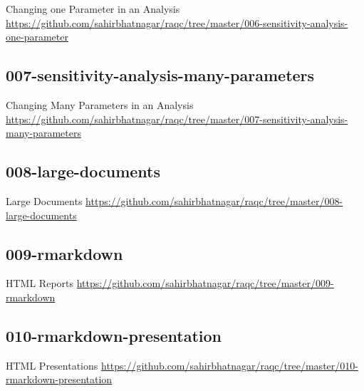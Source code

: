 \documentclass[10pt]{beamer}\usepackage[]{graphicx}\usepackage[]{color}
\begin{document}
\begin{frame}{Changing one Parameter in an Analysis}
\href{https://github.com/sahirbhatnagar/raqc/tree/master/006-sensitivity-analysis-one-parameter}{https://github.com/sahirbhatnagar/raqc/tree/master/006-sensitivity-analysis-one-parameter}
\end{frame}

\subsection{007-sensitivity-analysis-many-parameters}

\begin{frame}{Changing Many Parameters in an Analysis}
\href{https://github.com/sahirbhatnagar/raqc/tree/master/007-sensitivity-analysis-many-parameters}{https://github.com/sahirbhatnagar/raqc/tree/master/007-sensitivity-analysis-many-parameters}
\end{frame}


\subsection{008-large-documents}

\begin{frame}{Large Documents}
\href{https://github.com/sahirbhatnagar/raqc/tree/master/008-large-documents}{https://github.com/sahirbhatnagar/raqc/tree/master/008-large-documents}
\end{frame}

\subsection{009-rmarkdown}

\begin{frame}{HTML Reports}
\href{https://github.com/sahirbhatnagar/raqc/tree/master/009-rmarkdown}{https://github.com/sahirbhatnagar/raqc/tree/master/009-rmarkdown}
\end{frame}

\subsection{010-rmarkdown-presentation}

\begin{frame}{HTML Presentations}
\href{https://github.com/sahirbhatnagar/raqc/tree/master/010-rmarkdown-presentation}{https://github.com/sahirbhatnagar/raqc/tree/master/010-rmarkdown-presentation}
\end{frame}
\end{document}

